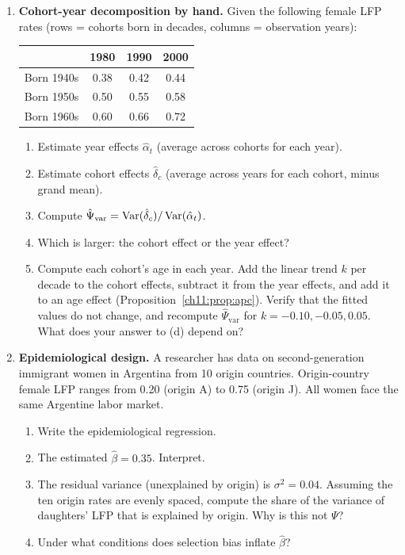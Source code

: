 \documentclass[../structural_economics_book.tex]{subfiles}
\begin{document}
\begin{enumerate}[label=\textbf{11.\arabic*}, leftmargin=3em]

\item \textbf{Cohort-year decomposition by hand.} Given the following female LFP rates (rows = cohorts born in decades, columns = observation years):
\begin{center}
\begin{tabular}{lccc}
\toprule
& 1980 & 1990 & 2000 \\
\midrule
Born 1940s & 0.38 & 0.42 & 0.44 \\
Born 1950s & 0.50 & 0.55 & 0.58 \\
Born 1960s & 0.60 & 0.66 & 0.72 \\
\bottomrule
\end{tabular}
\end{center}
\begin{enumerate}
\item Estimate year effects $\hat{\alpha}_t$ (average across cohorts for each year).
\item Estimate cohort effects $\hat{\delta}_c$ (average across years for each cohort, minus grand mean).
\item Compute $\hat{\Psi}_{\text{var}} = \operatorname{Var}(\hat{\delta}_c) / \operatorname{Var}(\hat{\alpha}_t)$.
\item Which is larger: the cohort effect or the year effect?
\item Compute each cohort's age in each year. Add the linear trend $k$ per decade to the cohort effects, subtract it from the year effects, and add it to an age effect (Proposition~\ref{ch11:prop:apc}). Verify that the fitted values do not change, and recompute $\hat{\Psi}_{\text{var}}$ for $k = -0.10, -0.05, 0.05$. What does your answer to (d) depend on?
\end{enumerate}

\item \textbf{Epidemiological design.} A researcher has data on second-generation immigrant women in Argentina from 10 origin countries. Origin-country female LFP ranges from 0.20 (origin A) to 0.75 (origin J). All women face the same Argentine labor market.
\begin{enumerate}
\item Write the epidemiological regression.
\item The estimated $\hat{\beta} = 0.35$. Interpret.
\item The residual variance (unexplained by origin) is $\sigma^2 = 0.04$. Assuming the ten origin rates are evenly spaced, compute the share of the variance of daughters' LFP that is explained by origin. Why is this not $\Psi$?
\item Under what conditions does selection bias inflate $\hat{\beta}$?
\end{enumerate}


\end{enumerate}
\end{document}
